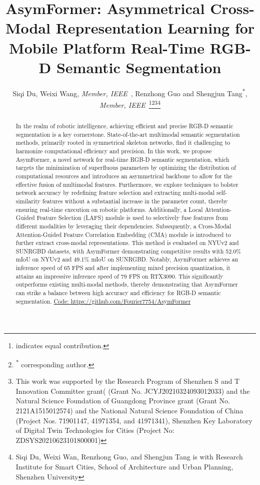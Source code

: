\documentclass[letterpaper, 10 pt, conference]{ieeeconf}
\title{\LARGE \bf
 AsymFormer: Asymmetrical Cross-Modal Representation Learning for Mobile Platform Real-Time RGB-D Semantic Segmentation
}
\author{Siqi Du\textsuperscript{},  Weixi Wang\textsuperscript{}, \emph{Member, IEEE}~, Renzhong Guo and Shengjun Tang\textsuperscript{*}, \emph{Member, IEEE}~\thanks{\textsuperscript{} indicates equal contribution.}\thanks{\textsuperscript{*} corresponding author.}\thanks{This work was supported by the Research Program of Shenzhen S and T Innovation Committee grant( (Grant No. JCYJ20210324093012033) and the Natural Science Foundation of Guangdong Province grant (Grant No. 2121A1515012574) and the National Natural Science Foundation of China (Project Nos. 71901147, 41971354, and 41971341), Shenzhen Key Laboratory of Digital Twin Technologies for Cities (Project No: ZDSYS20210623101800001)}\thanks{Siqi Du, Weixi Wan, Renzhong Guo, and Shengjun Tang is with Research Institute for Smart Cities, School of Architecture and Urban Planning, Shenzhen University}}
\begin{document}
\maketitle
\thispagestyle{empty}
\pagestyle{empty}


\begin{abstract}







In the realm of robotic intelligence, achieving efficient and precise RGB-D semantic segmentation is a key cornerstone. State-of-the-art multimodal semantic segmentation methods, primarily rooted in symmetrical skeleton networks, find it challenging to harmonize computational efficiency and precision. In this work, we propose AsymFormer, a novel network for real-time RGB-D semantic segmentation, which targets the minimization of superfluous parameters by optimizing the distribution of computational resources and introduces an asymmetrical backbone to allow for the effective fusion of multimodal features. Furthermore, we explore techniques to bolster network accuracy by redefining feature selection and extracting multi-modal self-similarity features without a substantial increase in the parameter count, thereby ensuring real-time execution on robotic platforms. Additionally, a Local Attention-Guided Feature Selection (LAFS) module is used to selectively fuse features from different modalities by leveraging their dependencies. Subsequently, a Cross-Modal Attention-Guided Feature Correlation Embedding (CMA) module is introduced to further extract cross-modal representations. This method is evaluated on NYUv2 and SUNRGBD datasets, with AsymFormer demonstrating competitive results with 52.0\% mIoU on NYUv2 and 49.1\% mIoU on SUNRGBD. Notably, AsymFormer achieves an inference speed of 65 FPS and after implementing mixed precision quantization, it attains an impressive inference speed of 79 FPS on RTX3090. This significantly outperforms existing multi-modal methods, thereby demonstrating that AsymFormer can strike a balance between high accuracy and efficiency for RGB-D semantic segmentation. \href{https://github.com/Fourier7754/AsymFormer}{Code: \textcolor[RGB]{78,101,155}{https://github.com/Fourier7754/AsymFormer}}

\end{abstract}
\end{document}
